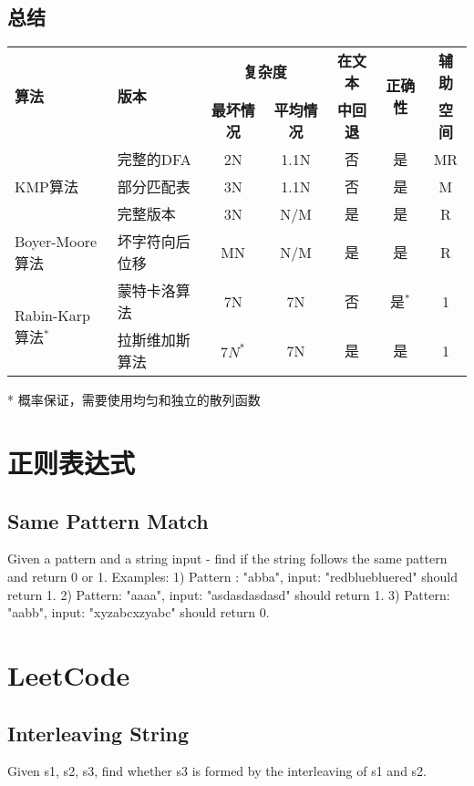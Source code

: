 \subsection{总结}
\vspace{1ex}
\begin{center}
\begin{tabular}{llccccc}
\hline
\multirow{2}{*}{\textbf{算法}} & \multirow{2}{*}{\textbf{版本}} & \multicolumn{2}{c}{\textbf{复杂度}} & \textbf{在文本} & \multirow{2}{*}{\textbf{正确性}} & \textbf{辅助}\\
\cline{3-4} & & \textbf{最坏情况} & \textbf{平均情况} & \textbf{中回退} & & \textbf{空间}\\
\hline
\multirow{3}{*}{KMP算法} & 完整的DFA & 2N & 1.1N & 否 & 是 & MR\\
                         & 部分匹配表 & 3N & 1.1N & 否 & 是 & M\\
						 & 完整版本 & 3N & N/M & 是 & 是 & R\\
\hline
Boyer-Moore算法 & 坏字符向后位移 & MN & N/M & 是 & 是 & R\\
\hline
\multirow{2}{*}{Rabin-Karp算法$^*$} & 蒙特卡洛算法 & 7N & 7N & 否 & 是$^*$ & 1\\
                         & 拉斯维加斯算法 & $7N^*$ & 7N & 是 & 是 & 1\\
\hline
\end{tabular}
\end{center}
\small{* 概率保证，需要使用均匀和独立的散列函数}


\section{正则表达式} %
\subsection{Same Pattern Match}
Given a pattern and a string input - find if the string follows 
the same pattern and return 0 or 1. 
Examples: 
1) Pattern : "abba", input: "redbluebluered" should return 1. 
2) Pattern: "aaaa", input: "asdasdasdasd" should return 1. 
3) Pattern: "aabb", input: "xyzabcxzyabc" should return 0. 

\section{LeetCode} %
\subsection{Interleaving String}
Given s1, s2, s3, find whether s3 is formed by the interleaving of s1 and s2.

